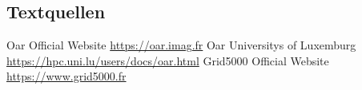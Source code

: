 \documentclass[10pt,utf8]{beamer}
\begin{document}
\subsection*{Textquellen}
\begin{frame}
	\begin{itemize}[]
	    \bibitem [0] {} Oar Official Website \url{https://oar.imag.fr}
	    \bibitem [0] {} Oar Universitys of Luxemburg \url{https://hpc.uni.lu/users/docs/oar.html}
	    \bibitem [0] {} Grid5000 Official Website \url{https://www.grid5000.fr}
    \end{itemize}
\end{frame}
\end{document}
